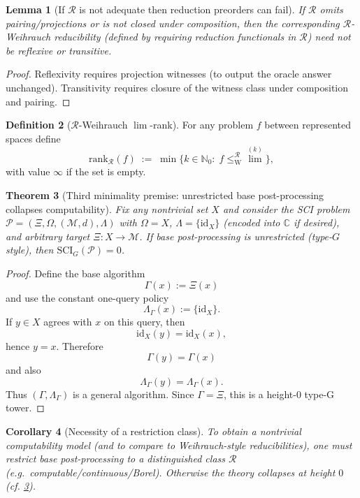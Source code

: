 \documentclass{lmcs} %
\theoremstyle{plain}
\theoremstyle{plain}
\newtheorem{theorem}{Theorem}[section]
\newtheorem{corollary}[theorem]{Corollary}
\newtheorem{lemma}[theorem]{Lemma}
\theoremstyle{definition}
\newtheorem{definition}[theorem]{Definition}
\theoremstyle{remark}
\theoremstyle{definition}
\theoremstyle{remark}
\numberwithin{equation}{section}
\newcommand{\NN}{\mathbb{N}}
\newcommand{\C}{\mathbb{C}}
\newcommand{\id}{\mathrm{id}}
\newcommand{\Lim}{\operatorname{lim}}
\newcommand{\Limi}[1]{\Lim^{(#1)}}
\begin{document}
\begin{lemma}[If $\mathcal{R}$ is not adequate then reduction preorders can fail]\label{lem:R-needed}
If $\mathcal{R}$ omits pairing/projections or is not closed under composition, then the corresponding
$\mathcal{R}$-Weihrauch reducibility (defined by requiring reduction functionals in $\mathcal{R}$)
need not be reflexive or transitive.
\end{lemma}
\begin{proof}
Reflexivity requires projection witnesses (to output the oracle answer unchanged).
Transitivity requires closure of the witness class under composition and pairing.
\end{proof}

\begin{definition}[$\mathcal R$-Weihrauch $\Lim$-rank]\label{def:R-lim-rank}
For any problem $f$ between represented spaces define
\[
\mathrm{rank}_{\mathcal R}(f)
\;:=\;
\min\bigl\{k\in\NN_0:\; f \le_{\mathrm W}^{\mathcal R} \Limi{k}\bigr\},
\]
with value $\infty$ if the set is empty.
\end{definition}

\begin{theorem}[Third minimality premise: unrestricted base post-processing collapses computability]\label{thm:unrestricted-collapses}
Fix any nontrivial set $X$ and consider the SCI problem $\mathcal{P}=(\Xi,\Omega,(\mathcal{M},d),\Lambda)$ with
$\Omega=X$, $\Lambda=\{\id_X\}$ (encoded into $\C$ if desired), and arbitrary target $\Xi:X\to\mathcal{M}$.
If base post-processing is unrestricted (type-$G$ style), then $\mathrm{SCI}_G(\mathcal{P})=0$.
\end{theorem}
\begin{proof}
Define the base algorithm
\[
\Gamma(x):=\Xi(x)
\]
and use the constant one-query policy
\[
\Lambda_\Gamma(x):=\{\mathrm{id}_X\}.
\]
If \(y\in X\) agrees with \(x\) on this query, then
\[
\mathrm{id}_X(y)=\mathrm{id}_X(x),
\]
hence \(y=x\).  Therefore
\[
\Gamma(y)=\Gamma(x)
\]
and also
\[
\Lambda_\Gamma(y)=\Lambda_\Gamma(x).
\]
Thus \((\Gamma,\Lambda_\Gamma)\) is a general algorithm. Since \(\Gamma=\Xi\), this is a height-\(0\) type-G tower.
\end{proof}

\begin{corollary}[Necessity of a restriction class]
To obtain a nontrivial computability model (and to compare to Weihrauch-style reducibilities),
one must restrict base post-processing to a distinguished class $\mathcal{R}$
(e.g.\ computable/continuous/Borel). Otherwise the theory collapses at height $0$
(cf. \cref{thm:unrestricted-collapses}).
\end{corollary}
\end{document}

